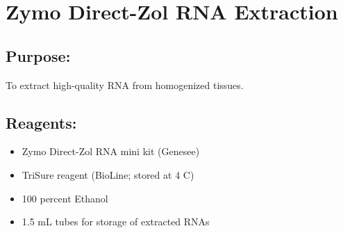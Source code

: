 \documentclass[a4paper,12pt,twoside]{book}
\begin{document}
	\thispagestyle{fancy}%
\section*{Zymo Direct-Zol RNA Extraction}
 \subsection*{Purpose:}
To extract high-quality RNA from homogenized tissues.
\subsection*{Reagents:}
\begin{itemize}
	\item Zymo Direct-Zol RNA mini kit (Genesee)
	\item TriSure reagent (BioLine; stored at 4 C)
	\item 100 percent Ethanol
	\item 1.5 mL tubes for storage of extracted RNAs
\end{itemize}
\end{document}
